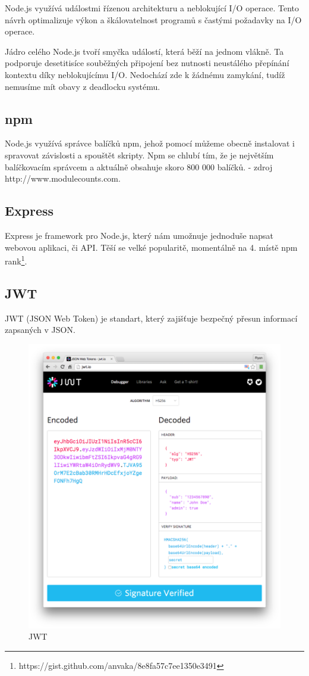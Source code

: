 \documentclass[thesis=B,czech]{FITthesis}[2012/06/26]
\begin{document}
            Node.js využívá událostmi řízenou architekturu a neblokující I/O operace. Tento návrh optimalizuje výkon a škálovatelnost programů s častými požadavky na I/O operace.
            
            Jádro celého Node.js tvoří smyčka událostí, která běží na jednom vlákně. Ta podporuje desetitisíce souběžných připojení bez nutnosti neustálého přepínání kontextu díky neblokujícímu I/O. Nedochází zde k žádnému zamykání, tudíž nemusíme mít obavy z deadlocku systému.
        \subsection{npm}
            Node.js využívá správce balíčků npm, jehož pomocí můžeme obecně instalovat i spravovat závislosti a spouštět skripty. Npm se chlubí tím, že je největším balíčkovacím správcem a aktuálně obsahuje skoro 800 000 balíčků. - zdroj http://www.modulecounts.com.
        \subsection{Express}
            Express je framework pro Node.js, který nám umožnuje jednoduše napsat webovou aplikaci, či API. Těší se velké popularitě, momentálně na 4. místě npm rank\footnote{https://gist.github.com/anvaka/8e8fa57c7ee1350e3491}.
        \subsection{JWT} \label{jwt}
            JWT (JSON Web Token) je standart, který zajišťuje bezpečný přesun informací zapsaných v JSON.
            \begin{figure}[ht!]
                \includegraphics[scale=0.4]{legacy-app-auth-5}
                \caption{JWT}
            \end{figure}
            
\end{document}
